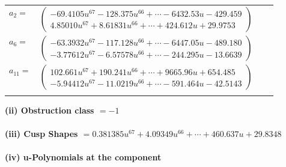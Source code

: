 \documentclass[1p]{elsarticle_modified}
\theoremstyle{definition}
\begin{document}
\begin{tabular}{m{7pt} m{180pt} m{7pt} m{180pt} }
\flushright $a_{2}=$&$\begin{pmatrix}-69.4105 u^{67}-128.375 u^{66}+\cdots-6432.53 u-429.459\\4.85010 u^{67}+8.61831 u^{66}+\cdots+424.612 u+29.9753\end{pmatrix}$ \\
\flushright $a_{6}=$&$\begin{pmatrix}-63.3932 u^{67}-117.128 u^{66}+\cdots-6447.05 u-489.180\\-3.77612 u^{67}-6.57578 u^{66}+\cdots-244.295 u-13.6639\end{pmatrix}$ \\
\flushright $a_{11}=$&$\begin{pmatrix}102.661 u^{67}+190.241 u^{66}+\cdots+9665.96 u+654.485\\-5.94412 u^{67}-11.0219 u^{66}+\cdots-591.464 u-42.5143\end{pmatrix}$\\&\end{tabular}
\flushleft \textbf{(ii) Obstruction class $= -1$}\\~\\
\flushleft \textbf{(iii) Cusp Shapes $= 0.381385 u^{67}+4.09349 u^{66}+\cdots+460.637 u+29.8348$}\\~\\
\newpage\renewcommand{\arraystretch}{1}
\flushleft \textbf{(iv) u-Polynomials at the component}\newline \\
\end{document}
